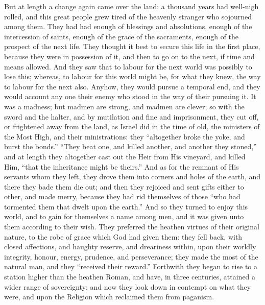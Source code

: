 But at length a change again came over the land: a
thousand years had well-nigh rolled, and this great people grew tired of the heavenly stranger who sojourned
among them. They had had enough of blessings and
absolutions, enough of the intercession of saints, enough
of the grace of the sacraments, enough of the prospect of
the next life. They thought it best to secure this life
in the first place, because they were in possession of
it, and then to go on to the next, if time and means
allowed. And they saw that to labour for the next world
was possibly to lose this; whereas, to labour for this
world might be, for what they knew, the way to labour for
the next also. Anyhow, they would pursue a temporal end,
and they would account any one their enemy who stood in
the way of their pursuing it. It was a madness; but
madmen are strong, and madmen are clever; so with the
sword and the halter, and by mutilation and fine and
imprisonment, they cut off, or frightened away from the
land, as Israel did in the time of old, the ministers of
the Most High, and their ministrations: they
``altogether broke the yoke, and burst the
bonds.'' ``They beat one, and killed another, and
another they stoned,'' and at length they altogether
cast out the Heir from His vineyard, and killed Him,
``that the inheritance might be theirs.'' And as
for the remnant of His servants whom they left, they
drove them into corners and holes of the earth, and there
they bade them die out; and then they rejoiced and sent
gifts either to other, and made merry, because they had
rid themselves of those ``who had tormented them that
dwelt upon the earth.'' And so they turned to enjoy
this world, and to gain for themselves a name among men,
and it was given unto them according to their wish. They
preferred the heathen virtues of their original nature,
to the robe of grace which God had given them: they fell
back, with closed affections, and haughty reserve, and
dreariness within, upon their worldly integrity, honour,
energy, prudence, and perseverance; they made the most of
the natural man, and they ``received their
reward.'' Forthwith they began to rise to a station
higher than the heathen Roman, and have, in three
centuries, attained a wider range of sovereignty; and now
they look down in contempt on what they were, and upon
the Religion which reclaimed them from paganism.

